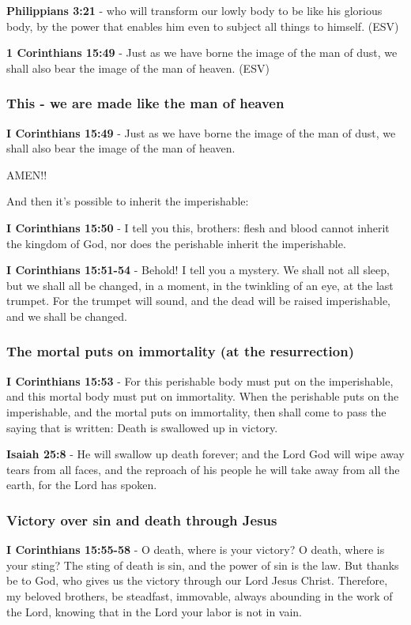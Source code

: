 \documentclass[11pt]{article}
\begin{document}
\textbf{Philippians 3:21} -  who will transform our lowly body to be like his glorious body, by the power that enables him even to subject all things to himself.  (ESV)

\textbf{1 Corinthians 15:49} -  Just as we have borne the image of the man of dust, we shall also bear the image of the man of heaven.  (ESV)

\subsubsection{This - we are made like the man of heaven}
\label{sec:org9002640}
\textbf{I Corinthians 15:49} - Just as we have borne the image of the man of dust, we shall also bear the image of the man of heaven.

AMEN!!

And then it's possible to inherit the imperishable:

\textbf{I Corinthians 15:50} - I tell you this, brothers: flesh and blood cannot inherit the kingdom of God, nor does the perishable inherit the imperishable.

\textbf{I Corinthians 15:51-54} - Behold! I tell you a mystery. We shall not all sleep, but we shall all be changed, in a moment, in the twinkling of an eye, at the last trumpet. For the trumpet will sound, and the dead will be raised imperishable, and we shall be changed.

\subsubsection{The mortal puts on immortality (at the resurrection)}
\label{sec:org86bdb52}
\textbf{I Corinthians 15:53} - For this perishable body must put on the imperishable, and this mortal body must put on immortality. When the perishable puts on the imperishable, and the mortal puts on immortality, then shall come to pass the saying that is written: Death is swallowed up in victory.

\textbf{Isaiah 25:8} - He will swallow up death forever; and the Lord God will wipe away tears from all faces, and the reproach of his people he will take away from all the earth, for the Lord has spoken.

\subsubsection{Victory over sin and death through Jesus}
\label{sec:orgbe6e533}
\textbf{I Corinthians 15:55-58} - O death, where is your victory? O death, where is your sting?  The sting of death is sin, and the power of sin is the law.  But thanks be to God, who gives us the victory through our Lord Jesus Christ.  Therefore, my beloved brothers, be steadfast, immovable, always abounding in the work of the Lord, knowing that in the Lord your labor is not in vain.
\end{document}
